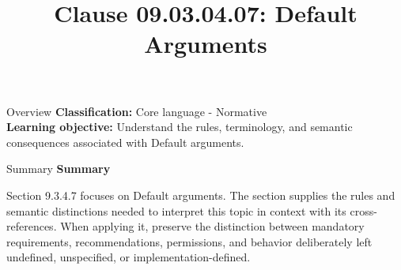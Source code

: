 \documentclass[10pt,letterpaper]{article}
\title{Clause 09.03.04.07: Default Arguments}
\author{}
\date{}
\begin{document}
\maketitle
\begin{CornellOverviewBox}{Overview}
\textbf{Classification:} Core language - Normative\\[2pt]
\textbf{Learning objective:} Understand the rules, terminology, and semantic consequences associated with Default arguments.
\end{CornellOverviewBox}\begin{CornellSummaryBox}{Summary}
{\sffamily\bfseries\color{Accent} Summary}\par\vspace{3pt}Section 9.3.4.7 focuses on Default arguments. The section supplies the rules and semantic distinctions needed to interpret this topic in context with its cross-references. When applying it, preserve the distinction between mandatory requirements, recommendations, permissions, and behavior deliberately left undefined, unspecified, or implementation-defined.
\end{CornellSummaryBox}
\end{document}
